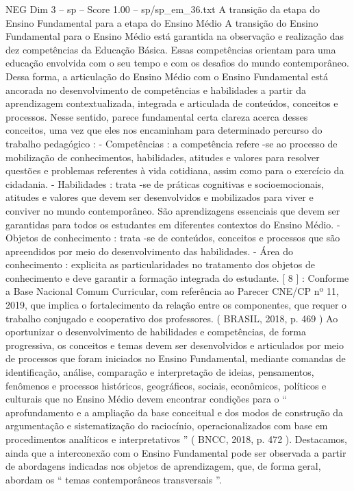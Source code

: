 \begin{textsample}{NEG Dim 3 – sp – Score 1.00 – sp/sp\_em\_36.txt}  \label{ex:f3_neg_087}
A transição da etapa do Ensino Fundamental para a etapa do Ensino Médio A transição do Ensino Fundamental para o Ensino Médio está garantida na observação e realização das dez competências da Educação Básica.
Essas competências orientam para uma educação envolvida com o seu tempo e com os desafios do mundo contemporâneo.
Dessa forma, a articulação do Ensino Médio com o Ensino Fundamental está ancorada no desenvolvimento de competências e habilidades a partir da aprendizagem contextualizada, integrada e articulada de conteúdos, conceitos e processos.
Nesse sentido, parece fundamental certa clareza acerca desses conceitos, uma vez que eles nos encaminham para determinado percurso do trabalho pedagógico : - Competências : a competência refere -se ao processo de mobilização de conhecimentos, habilidades, atitudes e valores para resolver questões e problemas referentes à vida cotidiana, assim como para o exercício da cidadania. - Habilidades : trata -se de práticas cognitivas e socioemocionais, atitudes e valores que devem ser desenvolvidos e mobilizados para viver e conviver no mundo contemporâneo.
São aprendizagens essenciais que devem ser garantidas para todos os estudantes em diferentes contextos do Ensino Médio. - Objetos de conhecimento : trata -se de conteúdos, conceitos e processos que são apreendidos por meio do desenvolvimento das habilidades. - Área do conhecimento : explicita as particularidades no tratamento dos objetos de conhecimento e deve garantir a formação integrada do estudante. [ 8 ] : Conforme a Base Nacional Comum Curricular, com referência ao Parecer CNE/CP nº 11, 2019, que implica o fortalecimento da relação entre os componentes, que requer o trabalho conjugado e cooperativo dos professores. ( BRASIL, 2018, p. 469 ) Ao oportunizar o desenvolvimento de habilidades e competências, de forma progressiva, os conceitos e temas devem ser desenvolvidos e articulados por meio de processos que foram iniciados no Ensino Fundamental, mediante comandas de identificação, análise, comparação e interpretação de ideias, pensamentos, fenômenos e processos históricos, geográficos, sociais, econômicos, políticos e culturais que no Ensino Médio devem encontrar condições para o “ aprofundamento e a ampliação da base conceitual e dos modos de construção da argumentação e sistematização do raciocínio, operacionalizados com base em procedimentos analíticos e interpretativos ” ( BNCC, 2018, p. 472 ).
Destacamos, ainda que a interconexão com o Ensino Fundamental pode ser observada a partir de abordagens indicadas nos objetos de aprendizagem, que, de forma geral, abordam os “ temas contemporâneos transversais ”.

\end{textsample}

